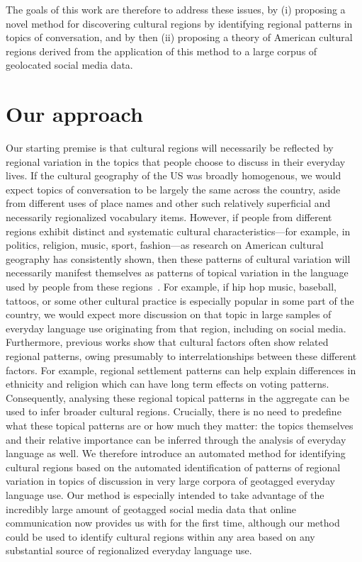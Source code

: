 \documentclass[../thesis.tex]{subfiles}
\begin{document}
The goals of this work are therefore to address these issues, by (i) proposing a novel
method for discovering cultural regions by identifying regional patterns in topics of
conversation, and by then (ii) proposing a theory of American cultural regions derived
from the application of this method to a large corpus of geolocated social media data.


\section{Our approach}
Our starting premise is that cultural regions will necessarily be reflected by regional
variation in the topics that people choose to discuss in their everyday lives. If the
cultural geography of the US was broadly homogenous, we would expect topics of
conversation to be largely the same across the country, aside from different uses of
place names and other such relatively superficial and necessarily regionalized
vocabulary items. However, if  people from different regions exhibit distinct and
systematic cultural characteristics—for example, in politics, religion, music, sport,
fashion—as research on American cultural geography has consistently shown, then these
patterns of cultural variation will necessarily manifest themselves as patterns of
topical variation in the language used by people from these
regions~\cite{kramsch2014language}. For example, if hip hop music,  baseball, tattoos,
or some other cultural practice is especially popular in some part of the country, we
would expect more discussion on that topic in large samples of everyday language use
originating from that region, including on social media. Furthermore, previous works
show that cultural factors often show related regional patterns, owing presumably to
interrelationships between these different factors. For example, regional settlement
patterns can help explain differences in ethnicity and religion which can have long term
effects on voting patterns. Consequently, analysing these regional topical patterns in
the aggregate can be used to infer broader cultural regions. Crucially, there is no need
to predefine what these topical patterns are or how much they matter: the topics
themselves and their relative importance can be inferred through the analysis of
everyday language as well. We therefore introduce an automated method for identifying
cultural regions based on the automated identification of patterns of regional variation
in topics of discussion in very large corpora of geotagged everyday language use. Our
method is especially intended to take advantage of the incredibly large amount of
geotagged social media data that online communication now provides us with for the first
time, although our method could be used to identify cultural regions within any area
based on any substantial source of regionalized everyday language use.
\end{document}
